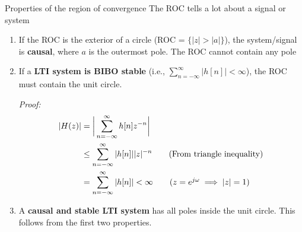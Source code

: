 \documentclass[10pt]{beamer}
\begin{document}
%
\begin{frame}{Properties of the region of convergence}
	The ROC tells a lot about a signal or system
	\begin{enumerate}
		\item If the ROC is the exterior of a circle (ROC = $\{|z| > |a|\}$), the system/signal is \textbf{causal}, where $a$ is the outermost pole. The ROC cannot contain any pole
		\pause\item If a \textbf{LTI system is BIBO stable} (i.e., $\sum_{n=-\infty}^{\infty} |h[n]|<\infty$), the ROC must contain the unit circle.
		
		\textit{Proof:}
		\vspace{-0.25cm}
		\begin{align*}
		|H(z)| &= \bigg|\sum_{n=-\infty}^{\infty}h[n]z^{-n}\bigg| \\
		&\leq \sum_{n=-\infty}^{\infty} |h[n]||z|^{-n} \tag{From triangle inequality} \\
		&= \sum_{n=-\infty}^{\infty} |h[n]| <\infty \tag{$z = e^{j\omega} \implies |z|=1$}
		\end{align*}
		\pause\item A \textbf{causal and stable LTI system} has all poles inside the unit circle. This follows from the first two properties.
	\end{enumerate}
\end{frame}
\end{document}
